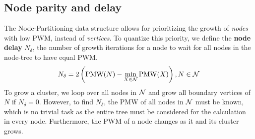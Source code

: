 


\subsection{Node parity and delay}\label{sec:paritydelaysus}

The Node-Partitioning data structure allows for prioritizing the growth of \emph{nodes} with low PWM, instead of \emph{vertices}. To quantize this priority, we define the \textbf{node delay} $N_\delta$, the number of growth iterations for a node to wait for all nodes in the node-tree to have equal PWM. 
\begin{equation}
    N_\delta = 2\left(\text{PMW}(N) - \min_{X\in\mathcal{N}}{\text{PMW}(X)}\right),  N \in \mathcal{N} 
\end{equation}
To grow a cluster, we loop over all nodes in $\mathcal{N}$ and grow all boundary vertices of $N$ if $N_\delta=0$. However, to find $N_\delta$, the PMW of all nodes in $\mathcal{N}$ must be known, which is no trivial task as the entire tree must be considered for the calculation in every node. Furthermore, the PWM of a node changes as it and its cluster grows. 

